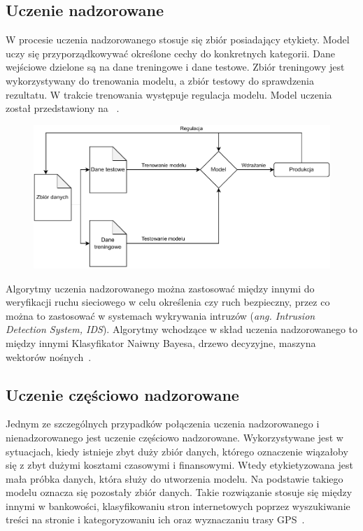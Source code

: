 \subsection{Uczenie nadzorowane}
W procesie uczenia nadzorowanego stosuje się zbiór posiadający etykiety. Model uczy się przyporządkowywać określone cechy do konkretnych kategorii. Dane wejściowe dzielone są na dane treningowe i dane testowe. Zbiór treningowy jest wykorzystywany do trenowania modelu, a zbiór testowy do sprawdzenia rezultatu. W trakcie trenowania występuje regulacja modelu. Model uczenia został przedstawiony na ~\cite{AiScience, Mahesh2018}.

\begin{figure}[H]
    \centering
    \includegraphics[width=1\textwidth]{images/supervised}
    \label{fig:spervised}
\end{figure}

Algorytmy uczenia nadzorowanego można zastosować między innymi do weryfikacji ruchu sieciowego w celu określenia czy ruch bezpieczny, przez co można to zastosować w systemach wykrywania intruzów (\textit{ang. Intrusion Detection System, IDS}). Algorytmy wchodzące w skład uczenia nadzorowanego to między innymi Klasyfikator Naiwny Bayesa, drzewo decyzyjne, maszyna wektorów nośnych~\cite{AiScience, Mahesh2018}.

\subsection{Uczenie częściowo nadzorowane}
Jednym ze szczególnych przypadków połączenia uczenia nadzorowanego i nienadzorowanego jest uczenie częściowo nadzorowane. Wykorzystywane jest w sytuacjach, kiedy istnieje zbyt duży zbiór danych, którego oznaczenie wiązałoby się z zbyt dużymi kosztami czasowymi i finansowymi. Wtedy etykietyzowana jest mała próbka danych, która służy do utworzenia modelu. Na podstawie takiego modelu oznacza się pozostały zbiór danych. Takie rozwiązanie stosuje się między innymi w bankowości, klasyfikowaniu stron internetowych poprzez wyszukiwanie treści na stronie i kategoryzowaniu ich oraz wyznaczaniu trasy GPS~\cite{semiLinkedin, Mahesh2018}.

